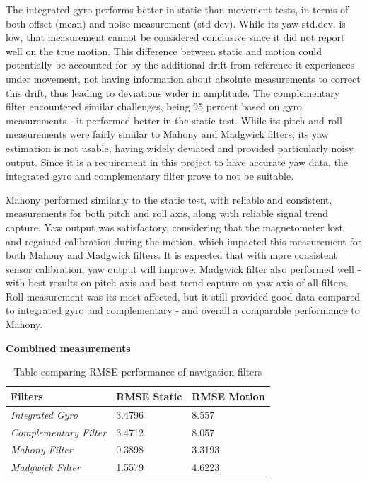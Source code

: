 The integrated gyro performs better in static than movement tests, in terms of both offset (mean) and noise measurement (std dev). While its yaw std.dev. is low, that measurement cannot be considered conclusive since it did not report well on the true motion. This difference between static and motion could potentially be accounted for by the additional drift from reference it experiences under movement, not having information about absolute measurements to correct this drift, thus leading to deviations wider in amplitude. The complementary filter encountered similar challenges, being 95 percent based on gyro measurements - it performed better in the static test. While its pitch and roll measurements were  fairly similar to Mahony and Madgwick filters, its yaw estimation is not usable, having widely deviated and provided particularly noisy output. Since it is a requirement in this project to have accurate yaw data, the integrated gyro and complementary filter prove to not be suitable. 

Mahony performed similarly to the static test, with reliable and consistent, measurements for both pitch and roll axis, along with reliable signal trend capture. Yaw output was satisfactory, considering that the magnetometer lost and regained calibration during the motion, which impacted this measurement for both Mahony and Madgwick filters. It is expected that with more consistent sensor calibration, yaw output will improve. Madgwick filter also performed well - with best results on pitch axis  and best trend capture on yaw axis of all filters. Roll measurement was its most affected, but it still provided good data compared to integrated gyro and complementary - and overall a comparable performance to Mahony. 


\textbf{Combined measurements}

\begin{table}[h!]
\centering
\begin{tabular}{ | m{7em} | m{1.5cm}|m{1.75cm}| } 
\hline
\textbf{Filters} & \textbf{RMSE Static} & \textbf{RMSE Motion} \\
\hline
\textit{Integrated Gyro} & 3.4796 & 8.557   \\
\hline
\textit{Complementary Filter}&3.4712 & 8.057  \\ 
\hline
\textit{Mahony Filter} &0.3898& 3.3193  \\ 
\hline
\textit{Madgwick Filter}& 1.5579& 4.6223  \\
\hline
\end{tabular}
\caption{Table comparing RMSE performance of navigation filters}
\label{table:3}
\end{table}

